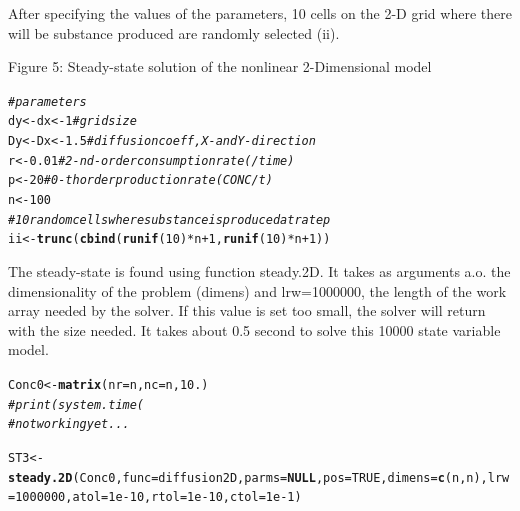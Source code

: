 \documentclass{tufte-handout}\usepackage[]{graphicx}\usepackage[]{color}
\makeatletter
\newcommand{\hlnum}[1]{\textcolor[rgb]{0.686,0.059,0.569}{#1}}%
\newcommand{\hlcom}[1]{\textcolor[rgb]{0.678,0.584,0.686}{\textit{#1}}}%
\newcommand{\hlopt}[1]{\textcolor[rgb]{0,0,0}{#1}}%
\newcommand{\hlstd}[1]{\textcolor[rgb]{0.345,0.345,0.345}{#1}}%
\newcommand{\hlkwa}[1]{\textcolor[rgb]{0.161,0.373,0.58}{\textbf{#1}}}%
\newcommand{\hlkwb}[1]{\textcolor[rgb]{0.69,0.353,0.396}{#1}}%
\newcommand{\hlkwc}[1]{\textcolor[rgb]{0.333,0.667,0.333}{#1}}%
\newcommand{\hlkwd}[1]{\textcolor[rgb]{0.737,0.353,0.396}{\textbf{#1}}}%
\newenvironment{kframe}{%
 \def\at@end@of@kframe{}%
 \ifinner\ifhmode%
  \def\at@end@of@kframe{\end{minipage}}%
  \begin{minipage}{\columnwidth}%
 \fi\fi%
 \def\FrameCommand##1{\hskip\@totalleftmargin \hskip-\fboxsep
 \colorbox{shadecolor}{##1}\hskip-\fboxsep
     \hskip-\linewidth \hskip-\@totalleftmargin \hskip\columnwidth}%
 \MakeFramed {\advance\hsize-\width
   \@totalleftmargin\z@ \linewidth\hsize
   \@setminipage}}%
 {\par\unskip\endMakeFramed%
 \at@end@of@kframe}
\newenvironment{knitrout}{}{} %
\makeatother
\begin{document}
After specifying the values of the parameters, 10 cells on the 2-D grid where there will be
substance produced are randomly selected (ii).


Figure 5: Steady-state solution of the nonlinear 2-Dimensional model

\begin{knitrout}
\color{fgcolor}\begin{kframe}
\begin{alltt}
\hlcom{# parameters}
\hlstd{dy} \hlkwb{<-} \hlstd{dx} \hlkwb{<-} \hlnum{1} \hlcom{# grid size}
\hlstd{Dy} \hlkwb{<-} \hlstd{Dx} \hlkwb{<-} \hlnum{1.5} \hlcom{# diffusion coeff, X- and Y-direction}
\hlstd{r} \hlkwb{<-} \hlnum{0.01} \hlcom{# 2-nd-order consumption rate (/time)}
\hlstd{p} \hlkwb{<-} \hlnum{20} \hlcom{# 0-th order production rate (CONC/t)}
\hlstd{n} \hlkwb{<-} \hlnum{100}
\hlcom{# 10 random cells where substance is produced at rate p}
\hlstd{ii} \hlkwb{<-} \hlkwd{trunc}\hlstd{(}\hlkwd{cbind}\hlstd{(}\hlkwd{runif}\hlstd{(}\hlnum{10}\hlstd{)}\hlopt{*}\hlstd{n}\hlopt{+}\hlnum{1}\hlstd{,}\hlkwd{runif}\hlstd{(}\hlnum{10}\hlstd{)}\hlopt{*}\hlstd{n}\hlopt{+}\hlnum{1}\hlstd{))}
\end{alltt}
\end{kframe}
\end{knitrout}
The steady-state is found using function steady.2D. It takes as arguments a.o. the dimensionality
of the problem (dimens) and lrw=1000000, the length of the work array needed by
the solver. If this value is set too small, the solver will return with the size needed.
It takes about 0.5 second to solve this 10000 state variable model.

\begin{knitrout}
\color{fgcolor}\begin{kframe}
\begin{alltt}
\hlstd{Conc0} \hlkwb{<-} \hlkwd{matrix}\hlstd{(}\hlkwc{nr}\hlstd{=n,}\hlkwc{nc}\hlstd{=n,}\hlnum{10.}\hlstd{)}
\hlcom{# print(system.time(}
\hlcom{# not working yet...}

\hlstd{ST3} \hlkwb{<-} \hlkwd{steady.2D}\hlstd{(Conc0,}\hlkwc{func}\hlstd{=diffusion2D,}\hlkwc{parms}\hlstd{=}\hlkwa{NULL}\hlstd{,}\hlkwc{pos}\hlstd{=}\hlnum{TRUE}\hlstd{,}\hlkwc{dimens}\hlstd{=}\hlkwd{c}\hlstd{(n,n),} \hlkwc{lrw}\hlstd{=}\hlnum{1000000}\hlstd{,}\hlkwc{atol}\hlstd{=}\hlnum{1e-10}\hlstd{,}\hlkwc{rtol}\hlstd{=}\hlnum{1e-10}\hlstd{,}\hlkwc{ctol}\hlstd{=}\hlnum{1e-1}\hlstd{)}
\end{alltt}
\end{kframe}
\end{knitrout}
\end{document}
